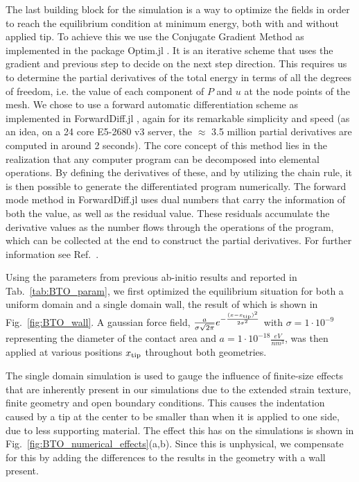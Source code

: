 The last building block for the simulation is a way to optimize the fields in order to reach the equilibrium condition at minimum energy, both with and without applied tip.
To achieve this we use the Conjugate Gradient Method \cite{Hestenes1952,Hager2005} as implemented in the package Optim.jl \cite{mogensen2018optim}.
It is an iterative scheme that uses the gradient and previous step to decide on the next step direction. 
This requires us to determine the partial derivatives of the total energy in terms of all the degrees of freedom, i.e. the value of each component of $P$ and $u$ at the node points of the mesh.
We chose to use a forward automatic differentiation scheme as implemented in ForwardDiff.jl \cite{RevelsLubinPapamarkou2016}, again for its remarkable simplicity and speed (as an idea, on a 24 core E5-2680 v3 server, the $\approx$ 3.5 million partial derivatives are computed in around 2 seconds).
The core concept of this method lies in the realization that any computer program can be decomposed into elemental operations. By defining the derivatives of these, and by utilizing the chain rule, it is then possible to generate the differentiated program numerically.
The forward mode method in ForwardDiff.jl uses dual numbers that carry the information of both the value, as well as the residual value. These residuals accumulate the derivative values as the number flows through the operations of the program, which can be collected at the end to construct the partial derivatives.
For further information see Ref.~\cite{Hoffmann2016}.

Using the parameters from previous ab-initio results \cite{Marton2010} and reported in Tab.~\ref{tab:BTO_param}, we first optimized the equilibrium situation for both a uniform domain and a single domain wall, the result of which is shown in Fig.~\ref{fig:BTO_wall}.
A gaussian force field, $\frac{a}{\sigma \sqrt{2\pi}}e^{-\frac{(x-x_{\rm tip})^2}{2\sigma^2}}$ with $\sigma = 1 \cdot 10^{-9}$ representing the diameter of the contact area and $a = 1 \cdot 10^{-18} \frac{eV}{nm^3}$, was then applied at various positions $x_{\rm tip}$ throughout both geometries.

The single domain simulation is used to gauge the influence of finite-size effects that are inherently present in our simulations due to the extended strain texture, finite geometry and open boundary conditions.
This causes the indentation caused by a tip at the center to be smaller than when it is applied to one side, due to less supporting material.
The effect this has on the simulations is shown in Fig.~\ref{fig:BTO_numerical_effects}(a,b).
Since this is unphysical, we compensate for this by adding the differences to the results in the geometry with a wall present.

